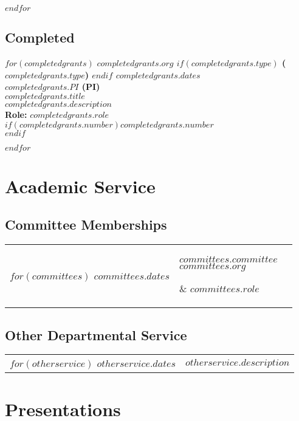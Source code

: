 \documentclass[12pt, martgin, line]{article}
\begin{document}
$endfor$


\subsection*{Completed}

$for(completedgrants)$
\textbf{$completedgrants.org$
$if(completedgrants.type)$
 ($completedgrants.type$)
$endif$
\hfill $completedgrants.dates$\\
$completedgrants.PI$ (PI)\\
$completedgrants.title$}\\
$completedgrants.description$\\
\textbf{Role:} $completedgrants.role$\\
$if(completedgrants.number)$$completedgrants.number$\\$endif$


$endfor$

\section*{Academic Service}
\subsection*{Committee Memberships}

\setlength{\extrarowheight}{.75em}
\begin{longtable}[l]{lp{3.5in}l}
  $for(committees)$
  $committees.dates$& 
  \parbox[t]{3.5in} { $committees.committee$\\
    \scriptsize{%
      $committees.org$
    }} &  $committees.role$ \\
  $endfor$
\end{longtable}
\setlength{\extrarowheight}{0em}

\subsection*{Other Departmental Service}

\setlength{\extrarowheight}{.75em}
\begin{longtable}[l]{lp{5.5in}}
  $for(otherservice)$
  $otherservice.dates$& 
  \parbox[t]{5.5in} { 
    $otherservice.description$
  } \\
  $endfor$
\end{longtable}
\setlength{\extrarowheight}{0em}

\section*{Presentations}
\end{document}
